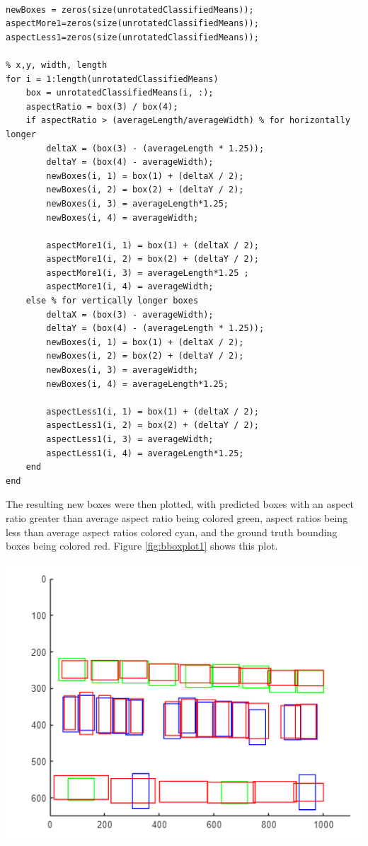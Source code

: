 \documentclass[man]{apa7}
\begin{document}
\begin{lstlisting}[]

newBoxes = zeros(size(unrotatedClassifiedMeans));
aspectMore1=zeros(size(unrotatedClassifiedMeans));
aspectLess1=zeros(size(unrotatedClassifiedMeans));

% x,y, width, length
for i = 1:length(unrotatedClassifiedMeans)
    box = unrotatedClassifiedMeans(i, :);
    aspectRatio = box(3) / box(4);
    if aspectRatio > (averageLength/averageWidth) % for horizontally longer
        deltaX = (box(3) - (averageLength * 1.25));
        deltaY = (box(4) - averageWidth);
        newBoxes(i, 1) = box(1) + (deltaX / 2);
        newBoxes(i, 2) = box(2) + (deltaY / 2);
        newBoxes(i, 3) = averageLength*1.25;
        newBoxes(i, 4) = averageWidth;

        aspectMore1(i, 1) = box(1) + (deltaX / 2);
        aspectMore1(i, 2) = box(2) + (deltaY / 2);
        aspectMore1(i, 3) = averageLength*1.25 ;
        aspectMore1(i, 4) = averageWidth;
    else % for vertically longer boxes
        deltaX = (box(3) - averageWidth);
        deltaY = (box(4) - (averageLength * 1.25));
        newBoxes(i, 1) = box(1) + (deltaX / 2);
        newBoxes(i, 2) = box(2) + (deltaY / 2);
        newBoxes(i, 3) = averageWidth;
        newBoxes(i, 4) = averageLength*1.25;

        aspectLess1(i, 1) = box(1) + (deltaX / 2);
        aspectLess1(i, 2) = box(2) + (deltaY / 2);
        aspectLess1(i, 3) = averageWidth;
        aspectLess1(i, 4) = averageLength*1.25;
    end
end
\end{lstlisting}

The resulting new boxes were then plotted, with predicted boxes with an aspect ratio greater than average aspect ratio being colored green, aspect ratios being less than average aspect ratios colored cyan, and the ground truth bounding boxes being colored red. Figure \ref{fig:bboxplot1} shows this plot.

\begin{minipage}{\linewidth}
  \includegraphics[height=\textheight/4,width=\textwidth/2]{figures/finalBbox1.png}
  \label{fig:bboxplot1}
\end{minipage}
\end{document}
